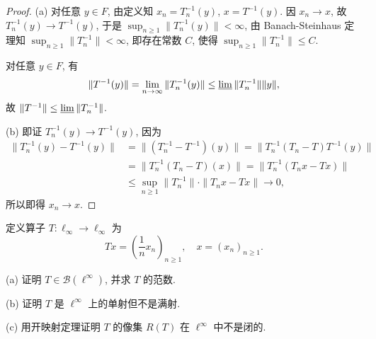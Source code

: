 \documentclass{mathexercise}
\begin{document}
\begin{proof}
    (a) 对任意 $y\in F$, 由定义知 $x_n=T_n^{-1}(y)$, $x=T^{-1}(y)$.
    因 $x_n\to x$, 故 $T_n^{-1}(y)\to T^{-1}(y)$, 于是 $\sup_{n\geq 1}\|T_n^{-1}(y)\|<\infty$,
    由 Banach-Steinhaus 定理知 $\sup_{n\geq 1}\|T_n^{-1}\|<\infty$,
    即存在常数 $C$, 使得 $\sup_{n\geq 1}\|T_n^{-1}\|\leq C$.

    对任意 $y\in F$, 有
    \[\|T^{-1}(y)\|=\lim_{n\to\infty}\|T_n^{-1}(y)\|\leq\varliminf\|T_n^{-1}\|\|y\|,\]
    故 $\|T^{-1}\|\leq\varliminf\|T_n^{-1}\|$.

    (b) 即证 $T_n^{-1}(y)\to T^{-1}(y)$, 因为
    \begin{align*}
        \|T_n^{-1}(y)-T^{-1}(y)\|
        &=\|(T_n^{-1}-T^{-1})(y)\|=\|T_n^{-1}(T_n-T)T^{-1}(y)\| \\
        &=\|T_n^{-1}(T_n-T)(x)\|=\|T_n^{-1}(T_nx-Tx)\| \\
        &\leq\sup_{n\geq 1}\|T_n^{-1}\|\cdot\|T_nx-Tx\|\to 0,
    \end{align*}
    所以即得 $x_n\to x$.
\end{proof}



\begin{exercise}
    定义算子 $T:\ell_{\infty}\to\ell_{\infty}$ 为
    \[Tx=\left(\frac{1}{n}x_n\right)_{n\geq 1},\quad x=(x_n)_{n\geq 1}.\]

    (a) 证明 $T \in \mathcal{B}\left(\ell^{\infty}\right)$, 并求 $T$ 的范数.

    (b) 证明 $T$ 是 $\ell^{\infty}$ 上的单射但不是满射.

    (c) 用开映射定理证明 $T$ 的像集 $R(T)$ 在 $\ell^{\infty}$ 中不是闭的.
\end{exercise}
\end{document}
